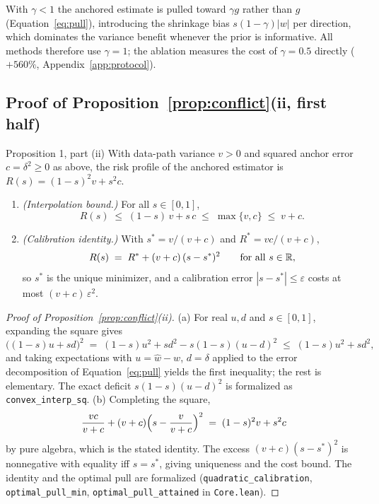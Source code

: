 \begin{remark}[The $\gamma = 1$ design principle]
With $\gamma < 1$ the anchored estimate is pulled toward $\gamma g$ rather than $g$ (Equation~\eqref{eq:pull}), introducing the shrinkage bias $s(1-\gamma)|w|$ per direction, which dominates the variance benefit whenever the prior is informative.
All methods therefore use $\gamma = 1$; the ablation measures the cost of $\gamma = 0.5$ directly ($+560\%$, Appendix~\ref{app:protocol}).
\end{remark}

\subsection{Proof of Proposition~\ref{prop:conflict}(ii, first half)}
\label{app:proof-imperfect}

\begin{restated}{Proposition 1, part (ii)}
With data-path variance $v > 0$ and squared anchor error $c = \delta^2 \ge 0$ as above, the risk profile of the anchored estimator is $R(s) = (1-s)^2 v + s^2 c$.
\begin{enumerate}
\item[(a)] \emph{(Interpolation bound.)}
For all $s \in [0,1]$,
\[
  R(s) \;\le\; (1 - s)\,v + s\,c \;\le\; \max\{v, c\} \;\le\; v + c .
\]
\item[(b)] \emph{(Calibration identity.)}
With $s^* = v/(v + c)$ and $R^* = vc/(v + c)$,
\[
  R(s) \;=\; R^* + (v + c)\,(s - s^*)^2 \qquad \text{for all } s \in \mathbb{R},
\]
so $s^*$ is the unique minimizer, and a calibration error $|s - s^*| \le \varepsilon$ costs at most $(v + c)\,\varepsilon^2$.
\end{enumerate}
\end{restated}

\begin{proof}[Proof of Proposition~\ref{prop:conflict}(ii)]
(a) For real $u, d$ and $s \in [0,1]$, expanding the square gives
\[
  \bigl((1-s)u + s d\bigr)^2
  \;=\; (1-s)u^2 + s d^2 - s(1-s)(u - d)^2
  \;\le\; (1-s)u^2 + s d^2 ,
\]
and taking expectations with $u = \widehat w - w$, $d = \delta$ applied to the error decomposition of Equation~\eqref{eq:pull} yields the first inequality; the rest is elementary.
The exact deficit $s(1-s)(u-d)^2$ is formalized as \texttt{convex\_interp\_sq}.
(b) Completing the square,
\[
  \frac{vc}{v+c} + (v+c)\Bigl(s - \frac{v}{v+c}\Bigr)^{2}
  \;=\; (1-s)^2 v + s^2 c
\]
by pure algebra, which is the stated identity.
The excess $(v+c)(s - s^*)^2$ is nonnegative with equality iff $s = s^*$, giving uniqueness and the cost bound.
The identity and the optimal pull are formalized (\texttt{quadratic\_calibration}, \texttt{optimal\_pull\_min}, \texttt{optimal\_pull\_attained} in \texttt{Core.lean}).
\end{proof}

